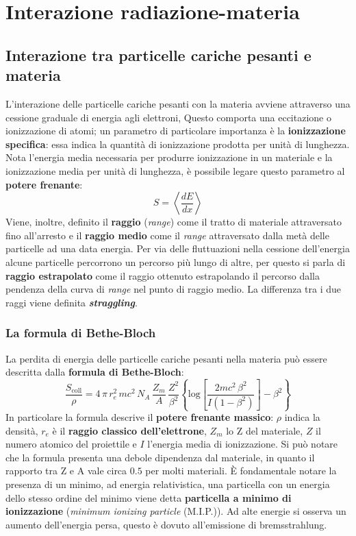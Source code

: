 \chapter{Interazione radiazione-materia}
\section{Interazione tra particelle cariche pesanti e materia}
L'interazione delle particelle cariche pesanti con la materia avviene attraverso una cessione graduale di energia agli elettroni,
Questo comporta una eccitazione o ionizzazione di atomi; un parametro di particolare importanza \`e la \textbf{ionizzazione specifica}:
essa indica la quantit\`a di ionizzazione prodotta per unit\`a di lunghezza.
Nota l'energia media necessaria per produrre ionizzazione in un materiale e la ionizzazione media per unit\`a di lunghezza, \`e possibile legare questo parametro al \textbf{potere frenante}:
\begin{equation*}
S = \left \langle \frac{dE}{dx}\right \rangle
\end{equation*}
Viene, inoltre, definito il \textbf{raggio} (\textit{range}) come il tratto di materiale attraversato fino all'arresto e il
\textbf{raggio medio} come il \textit{range} attraversato dalla met\`a delle particelle ad una data energia.
Per via delle fluttuazioni nella cessione dell'energia alcune particelle percorrono un percorso pi\`u lungo di altre, per questo
si parla di \textbf{raggio estrapolato} come il raggio ottenuto estrapolando il percorso dalla pendenza della curva di \textit{range}
nel punto di raggio medio.
La differenza tra i due raggi viene definita \textbf{\textit{straggling}}.\\
\subsection{La formula di Bethe-Bloch}
La perdita di energia delle particelle cariche pesanti nella materia pu\`o essere descritta dalla \textbf{formula di Bethe-Bloch}:
\begin{equation*}
\frac{S_{\text{coll}}}{\rho} = 4 \, \pi \, r_e^2 \, mc^2 \, N_A \, \frac{Z_m}{A} \, \frac{Z^2}{\beta^2}\left \{ \text{log} \left[ \frac{2 mc^2 \, \beta^2}{I(1-\beta^2)} \right] - \beta^2 \right\}
\end{equation*}
In particolare la formula descrive il \textbf{potere frenante massico}: $\rho$ indica la densit\`a, $r_e$ \`e il \textbf{raggio classico dell'elettrone}, $Z_m$ lo Z del materiale, $Z$ il numero atomico del proiettile e $I$ l'energia media di ionizzazione.
Si pu\`o notare che la formula presenta una debole dipendenza dal materiale, in quanto il rapporto tra Z e A vale circa $0.5$ per molti materiali.
\`E fondamentale notare la presenza di un minimo, ad energia relativistica, una particella con un energia dello stesso ordine del minimo viene detta \textbf{particella a minimo di ionizzazione}
(\textit{minimum ionizing particle} (M.I.P.)).
Ad alte energie si osserva un aumento dell'energia persa, questo \`e dovuto all'emissione di bremsstrahlung.
